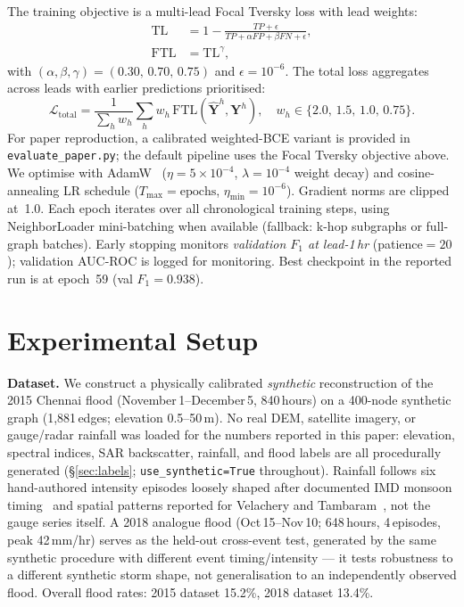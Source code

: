 \documentclass[10pt,twocolumn]{article}
\newcommand{\mat}[1]{\mathbf{#1}}
\begin{document}
The training objective is a multi-lead Focal Tversky loss with lead weights:
\begin{align}
  \mathrm{TL} &= 1 - \frac{TP + \epsilon}{TP + \alpha FP + \beta FN + \epsilon}, \\
  \mathrm{FTL} &= \mathrm{TL}^{\gamma},
\end{align}
with $(\alpha,\beta,\gamma)=(0.30,\,0.70,\,0.75)$ and $\epsilon{=}10^{-6}$.
The total loss aggregates across leads with earlier predictions prioritised:
\begin{equation}
  \mathcal{L}_{\text{total}} =
    \frac{1}{\sum_h w_h}\sum_{h} w_h\,\mathrm{FTL}(\hat{\mat{Y}}^h,\mat{Y}^h),
  \quad
  w_h \in \{2.0,\,1.5,\,1.0,\,0.75\}.
  \label{eq:loss}
\end{equation}
For paper reproduction, a calibrated weighted-BCE variant is provided in
\texttt{evaluate\_paper.py}; the default pipeline uses the Focal Tversky
objective above.
We optimise with AdamW~\cite{loshchilov2019} ($\eta{=}5\times10^{-4}$,
$\lambda{=}10^{-4}$ weight decay) and cosine-annealing LR schedule
($T_{\max}{=}\text{epochs}$, $\eta_{\min}{=}10^{-6}$).
Gradient norms are clipped at~1.0.
Each epoch iterates over all chronological training steps, using
NeighborLoader mini-batching when available (fallback: k-hop subgraphs or
full-graph batches).
Early stopping monitors \emph{validation $F_1$ at lead-1\,hr}
(patience${=}20$); validation AUC-ROC is logged for monitoring.
Best checkpoint in the reported run is at epoch~59 (val $F_1{=}0.938$).

\section{Experimental Setup}
\label{sec:exp}

\noindent\textbf{Dataset.}
We construct a physically calibrated \emph{synthetic} reconstruction of the
2015 Chennai flood (November\,1--December\,5, 840\,hours) on a
400-node synthetic graph (1,881\,edges; elevation 0.5--50\,m).
No real DEM, satellite imagery, or gauge/radar rainfall was loaded for the
numbers reported in this paper: elevation, spectral indices, SAR backscatter,
rainfall, and flood labels are all procedurally generated
(\S\ref{sec:labels}; \texttt{use\_synthetic=True} throughout). Rainfall
follows six hand-authored intensity episodes loosely shaped after documented
IMD monsoon timing~\cite{imd2016} and spatial patterns reported for Velachery
and Tambaram~\cite{raghavan2016}, not the gauge series itself.
A 2018 analogue flood (Oct\,15--Nov\,10; 648\,hours, 4\,episodes, peak
42\,mm/hr) serves as the held-out cross-event test, generated by the same
synthetic procedure with different event timing/intensity — it tests
robustness to a different synthetic storm shape, not generalisation to an
independently observed flood.
Overall flood rates: 2015 dataset 15.2\%, 2018 dataset 13.4\%.
\end{document}
